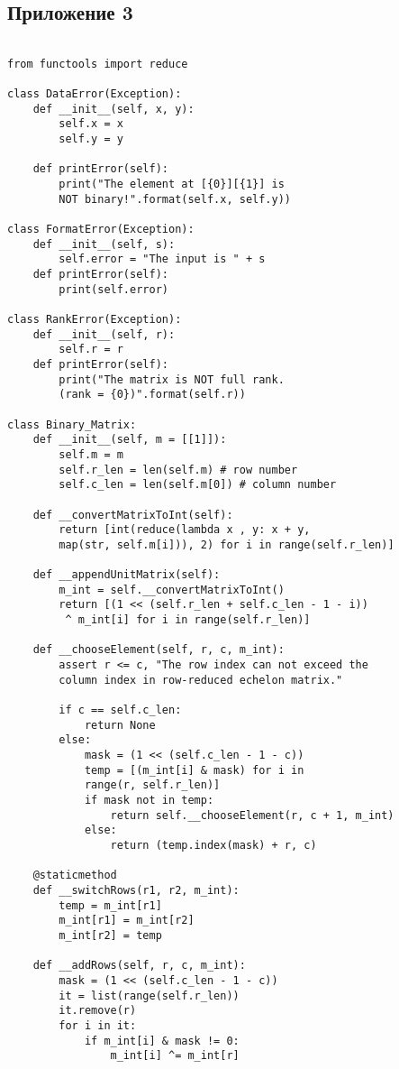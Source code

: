 \documentclass[12pt]{article}
\begin{document}
\subsection{Приложение 3}
\begin{verbatim}

from functools import reduce

class DataError(Exception):
    def __init__(self, x, y):
        self.x = x
        self.y = y

    def printError(self):
        print("The element at [{0}][{1}] is 
        NOT binary!".format(self.x, self.y))

class FormatError(Exception):
    def __init__(self, s):
        self.error = "The input is " + s
    def printError(self):
        print(self.error)

class RankError(Exception):
    def __init__(self, r):
        self.r = r
    def printError(self):
        print("The matrix is NOT full rank. 
        (rank = {0})".format(self.r))

class Binary_Matrix:
    def __init__(self, m = [[1]]):
        self.m = m
        self.r_len = len(self.m) # row number
        self.c_len = len(self.m[0]) # column number

    def __convertMatrixToInt(self):
        return [int(reduce(lambda x , y: x + y, 
        map(str, self.m[i])), 2) for i in range(self.r_len)]

    def __appendUnitMatrix(self):
        m_int = self.__convertMatrixToInt()
        return [(1 << (self.r_len + self.c_len - 1 - i))
         ^ m_int[i] for i in range(self.r_len)]

    def __chooseElement(self, r, c, m_int):
        assert r <= c, "The row index can not exceed the
        column index in row-reduced echelon matrix."

        if c == self.c_len:
            return None
        else:
            mask = (1 << (self.c_len - 1 - c))
            temp = [(m_int[i] & mask) for i in 
            range(r, self.r_len)]
            if mask not in temp:
                return self.__chooseElement(r, c + 1, m_int)
            else:
                return (temp.index(mask) + r, c)

    @staticmethod
    def __switchRows(r1, r2, m_int):
        temp = m_int[r1]
        m_int[r1] = m_int[r2]
        m_int[r2] = temp

    def __addRows(self, r, c, m_int):
        mask = (1 << (self.c_len - 1 - c))
        it = list(range(self.r_len))
        it.remove(r)
        for i in it:
            if m_int[i] & mask != 0:
                m_int[i] ^= m_int[r]


\end{verbatim}
\end{document}
